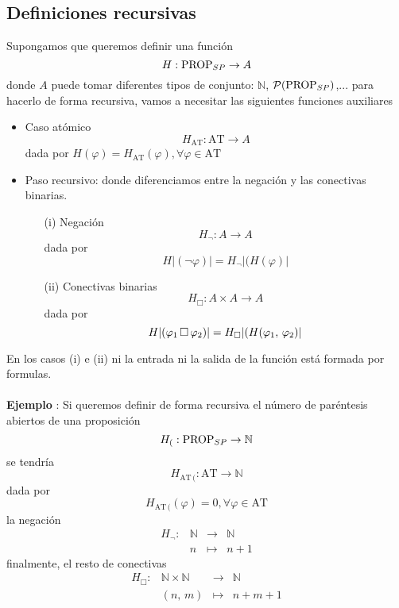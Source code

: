 \subsection*{Definiciones recursivas}
Supongamos que queremos definir una función 
\[ H: \mbox{PROP}_{SP} \rightarrow A \]
donde $A$ puede tomar diferentes tipos de conjunto: $\mathbb{N}$, $\mathcal{P}(\mbox{PROP}_{SP})$,... para hacerlo de forma recursiva, vamos a necesitar las siguientes funciones auxiliares
\begin{itemize}
	\item Caso atómico
	\[ H_{\mbox{AT}}: \mbox{AT} \rightarrow A \]
dada por $H(\varphi)=H_{\mbox{AT}}(\varphi), \forall \varphi \in \mbox{AT}$
	\item Paso recursivo: donde diferenciamos entre la negación y las conectivas binarias. 
	\begin{itemize}
		\item[(i)] Negación 
		\[ H_{\lnot}: A \rightarrow A \]
		dada por 
	\[ H \vert (\lnot \varphi) \vert = H_{\lnot}\vert (H(\varphi) \vert \]
		\item[(ii)] Conectivas binarias 
		\[ H_{\Box}: A \times A \rightarrow A \]
		dada por 
	\[ H \vert (\varphi_1 \, \Box \, \varphi_2) \vert = H_{\Box}\vert (H(\varphi_1, \, \varphi_2) \vert \]
	\end{itemize}
\end{itemize} 
En los casos (i) e (ii) ni la entrada ni la salida de la función está formada por formulas. 
\paragraph{}
\addtocounter{ej}{1} %
\textbf{Ejemplo }: Si queremos definir de forma recursiva el número de paréntesis abiertos de una proposición
\[ H_{(}: \mbox{PROP}_{SP} \rightarrow \mathbb{N} \] 
se tendría
\[ H_{\mbox{AT}\,(}: \mbox{AT} \rightarrow \mathbb{N} \]
dada por
\[ H_{\mbox{AT}\,(}(\varphi)=0, \forall \varphi \in \mbox{AT} \]
la negación
\[ \begin{matrix}
 H_{\lnot}: & \mathbb{N} & \rightarrow & \mathbb{N}\\
 &n& \longmapsto &  n+1
\end{matrix} \] 
finalmente, el resto de conectivas 
\[ \begin{matrix}
 H_{\Box}:  & \mathbb{N} \times \mathbb{N} & \rightarrow & \mathbb{N}\\
 &(n,\, m)& \longmapsto &  n+m+1
\end{matrix} \] 
